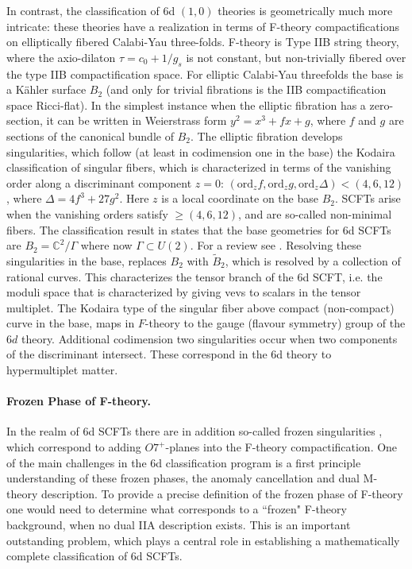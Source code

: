 \documentclass[12pt]{article}
\begin{document}
In contrast, the classification of 6d $(1,0)$ theories is geometrically much more intricate: these theories have a realization in terms of F-theory compactifications on elliptically fibered Calabi-Yau three-folds. F-theory is Type IIB string theory, where the axio-dilaton $\tau = c_0 + 1/g_s$ is not constant, but non-trivially fibered over the type IIB compactification space. For elliptic Calabi-Yau threefolds the base is a K\"ahler surface $B_2$ (and only for trivial fibrations is the IIB compactification space Ricci-flat). 
In the simplest instance when the elliptic fibration has a zero-section, it can be written in Weierstrass form 
$y^2 = x^3 + fx + g$, 
where $f$ and $g$ are sections of the canonical bundle of $B_2$. The elliptic fibration develops singularities, which follow (at least in codimension one in the base) the Kodaira classification of singular fibers, which is characterized in terms of the vanishing order  along a discriminant component $z=0$:
$(\text{ord}_{z} f,\text{ord}_{z} g, \text{ord}_{z} \Delta)  < (4,6,12)$, where $\Delta = 4 f^3+ 27 g^2$. 
Here $z$ is a local coordinate on the base $B_2$. SCFTs arise when the vanishing orders satisfy $\geq (4,6,12)$, and are so-called non-minimal fibers. 
The classification result in \cite{Heckman:2013pva,Heckman:2015bfa, Bhardwaj:2015xxa} states that the base geometries for 6d SCFTs are $B_2 = \mathbb{C}^2/\Gamma$ where now $\Gamma \subset U(2)$. For a review see \cite{Heckman:2018jxk}.
Resolving these singularities in the base, replaces $B_2$ with $\tilde{B}_2$, which is resolved by a collection of rational curves. This characterizes the tensor branch of the 6d SCFT, i.e. the moduli space that is characterized by giving vevs to scalars in the tensor multiplet. 
The Kodaira type of the singular fiber above compact (non-compact) curve in the base, maps in $F$-theory to the gauge (flavour symmetry) group of the $6d$ theory. Additional codimension two singularities occur when two components of the  discriminant  intersect. These correspond in the 6d theory to hypermultiplet matter. 

\paragraph{Frozen Phase of F-theory.}
In the realm of 6d SCFTs there are in addition so-called frozen singularities \cite{deBoer:2001wca, Tachikawa:2015wka, Bhardwaj:2018jgp}, which correspond to adding $O7^+$-planes into the F-theory compactification. One of the main challenges in the 6d classification program is a first principle understanding of these frozen phases, the anomaly cancellation and dual M-theory description. 
To provide a precise definition of the frozen phase of F-theory one would need to determine what corresponds to a ``frozen" F-theory background, when no dual IIA description exists. This is an important outstanding problem, which plays a central role in establishing a mathematically complete classification of 6d SCFTs. 
\end{document}
